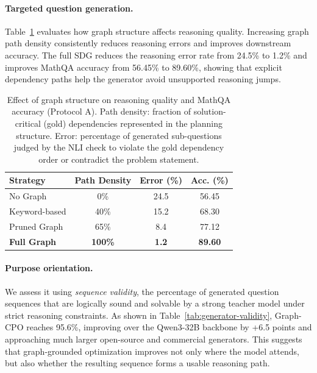 \documentclass[sigconf, anonymous, review, screen]{acmart}
\begin{document}
\paragraph{Targeted question generation.}
Table~\ref{tab:kg-ablation} evaluates how graph structure affects reasoning quality. Increasing graph path density consistently reduces reasoning errors and improves downstream accuracy. The full SDG reduces the reasoning error rate from 24.5\% to 1.2\% and improves MathQA accuracy from 56.45\% to 89.60\%, showing that explicit dependency paths help the generator avoid unsupported reasoning jumps.

\begin{table}[t]
\centering
\footnotesize
\caption{Effect of graph structure on reasoning quality and MathQA accuracy (Protocol A). Path density: fraction of solution-critical (gold) dependencies represented in the planning structure. Error: percentage of generated sub-questions judged by the NLI check to violate the gold dependency order or contradict the problem statement.}
\label{tab:kg-ablation}

\begin{tabular*}{\columnwidth}{@{\extracolsep{\fill}}lccc}
\toprule
\textbf{Strategy} & \textbf{Path Density} & \textbf{Error (\%)} & \textbf{Acc. (\%)} \\
\midrule
No Graph & 0\% & 24.5 & 56.45 \\
Keyword-based & 40\% & 15.2 & 68.30 \\
Pruned Graph & 65\% & 8.4 & 77.12 \\
\textbf{Full Graph} & \textbf{100\%} & \textbf{1.2} & \textbf{89.60} \\
\bottomrule
\end{tabular*}

\end{table}

\paragraph{Purpose orientation.}
We assess it using \emph{sequence validity}, the percentage of generated question sequences that are logically sound and solvable by a strong teacher model under strict reasoning constraints. As shown in Table~\ref{tab:generator-validity}, Graph-CPO reaches 95.6\%, improving over the Qwen3-32B backbone by +6.5 points and approaching much larger open-source and commercial generators. This suggests that graph-grounded optimization improves not only where the model attends, but also whether the resulting sequence forms a usable reasoning path.
\end{document}
